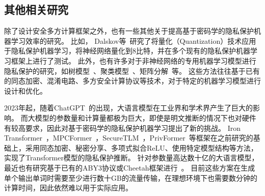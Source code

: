 \subsection{其他相关研究}
除了设计安全多方计算框架之外，也有一些其他关于提高基于密码学的隐私保护机器学习效率的研究。
%
比如，
Dalskov等~\cite{dalskov2020secure_q8}研究了将量化（Quantization）技术应用于隐私保护机器学习，将神经网络量化到8比特，并在多个现有的隐私保护机器学习框架上进行了测试。
%
此外，也有许多对于非神经网络的专用机器学习模型进行隐私保护的研究，如树模型~\cite{wu2020vf_tree,fang2021secure_xgb,lu2023squirrel}、聚类模型~\cite{bunn2007secure_kmeans,wu2020secure_kmeans}、矩阵分解~\cite{nikolaenko2013ppmf,kim2018ppmf}等。
%
这些方法往往基于已有的同态加密、混淆电路、多方安全计算协议等技术，对于特定的机器学习模型进行设计和优化。
%


2023年起，随着ChatGPT~\cite{chatgpt}的出现，大语言模型在工业界和学术界产生了巨大的影响。
%
而大模型的参数量和计算量都极为巨大，即使是明文推断的情况下也对硬件有较高要求，因此对基于密码学的隐私保护机器学习提出了新的挑战。
%
Iron Transformer~\cite{hao2022iron}，MPCFormer~\cite{li2022mpcformer}，SecureTLM~\cite{chen2024securetlm}，PrivFormer~\cite{akimoto2023privformer}等框架在之前研究的基础上，采用同态加密、秘密分享、多项式拟合ReLU、使用特定模型结构等方法，实现了Transformer模型的隐私保护推断。
%
针对参数量高达数十亿的大语言模型，最近也有研究基于已有的ABY3协议或Cheetah框架进行~\cite{dong2023puma,lu2023bumblebee,hou2023ciphergpt}。
目前这些方案在生成单个输出单词时需要至少进行数十GB的流量传输，在理想环境下也需要数分钟的计算时间，因此依然难以用于实际应用。



